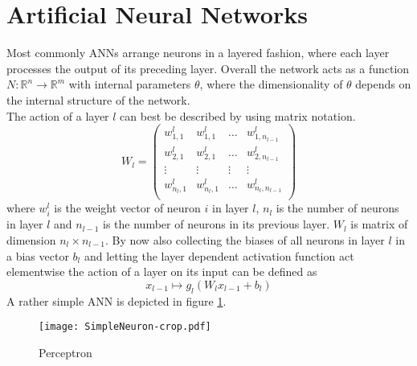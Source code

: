 \section{Artificial Neural Networks}
\label{sec:ANN}
Most commonly ANNs arrange neurons in a layered fashion, where each layer processes the output of its preceding layer. Overall the network acts as a function $N: \mathbb{R}^n \rightarrow \mathbb{R}^m$ with internal parameters $\theta$, where the dimensionality of $\theta$ depends on the internal structure of the network.\\
The action of a layer $l$ can best be described by using matrix notation. 
\begin{equation}
W_l = 
\begin{pmatrix}
w_{1,1}^l & w_{1,1}^l & \dots & w_{1,n_{l-1}}^l \\
w_{2,1}^l & w_{2,1}^l & \dots & w_{2,n_{l-1}}^l \\
\vdots & \vdots & \vdots & \vdots \\
w_{n_l,1}^l & w_{n_l,1}^l & \dots & w_{n_l,n_{l-1}}^l \\
\end{pmatrix}
\end{equation}
where $w_i^l$ is the weight vector of neuron $i$ in layer $l$, $n_l$ is the number of neurons in layer $l$ and $n_{l-1}$ is the number of neurons in its previous layer. $W_l$ is matrix of dimension $n_l \times n_{l-1}$. By now also collecting the biases of all neurons in layer $l$ in a bias vector $b_l$ and letting the layer dependent activation function act elementwise the action of a layer on its input can be defined as
\begin{equation}
x_{l-1} \mapsto g_l(W_l x_{l-1} + b_l)
\end{equation}
A rather simple ANN is depicted in figure \ref{fig:ANN}.
\begin{figure}
\centering
  \texttt{[image: SimpleNeuron-crop.pdf]}
  \caption{Perceptron}
  \label{fig:ANN}
\end{figure}


